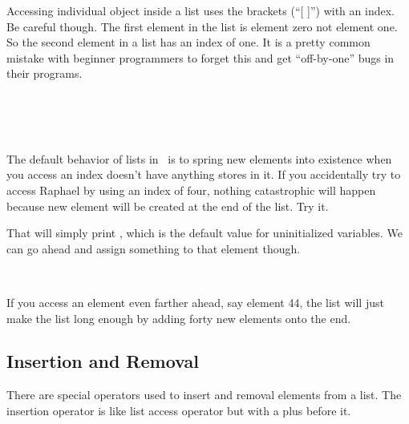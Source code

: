 Accessing individual object inside a list uses the brackets (``[ ]'') with an index.  Be careful though.  The first element in the list is element zero not element one.  So the second element in a list has an index of one.  It is a pretty common mistake with beginner programmers to forget this and get ``off-by-one'' bugs in their programs.

\begin{SSCodeBox}
\scitea{ TeenageMutantNinjaTurtles[}
\scitea{];} \\
\scitea{} \\
\scitea{ TeenageMutantNinjaTurtles[}
\scitea{];} \\
\end{SSCodeBox}

The default behavior of lists in \SSquared\ is to spring new elements into existence when you access an index doesn't have anything stores in it.
If you accidentally try to access Raphael by using an index of four, nothing catastrophic will happen because new element will be created at the end of the list.  Try it.

\begin{SSCodeBox}
\scitea{ TeenageMutantNinjaTurtles[}
\scitea{];}
\end{SSCodeBox}

That will simply print , which is the default value for uninitialized variables.  We can go ahead and assign something to that element though.

\begin{SSCodeBox}
\scitea{} \\
\scitea{TeenageMutantNinjaTurtles[}
\scitea{] = }
\scitea{;}
\end{SSCodeBox}

If you access an element even farther ahead, say element 44, the list will just make the list long enough by adding forty new elements onto the end.

\subsection{Insertion and Removal}

There are special operators used to insert and removal elements from a list.  The insertion operator is like list access operator but with a plus before it.

